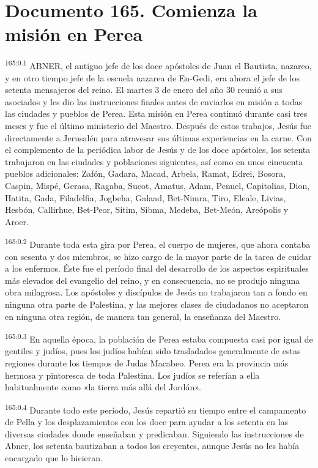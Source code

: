 \chapter{Documento 165. Comienza la misión en Perea}
\par 
\textsuperscript{165:0.1} ABNER, el antiguo jefe de los doce apóstoles de Juan el Bautista, nazareo, y en otro tiempo jefe de la escuela nazarea de En-Gedi, era ahora el jefe de los setenta mensajeros del reino. El martes 3 de enero del año 30 reunió a sus asociados y les dio las instrucciones finales antes de enviarlos en misión a todas las ciudades y pueblos de Perea. Esta misión en Perea continuó durante casi tres meses y fue el último ministerio del Maestro. Después de estos trabajos, Jesús fue directamente a Jerusalén para atravesar sus últimas experiencias en la carne. Con el complemento de la periódica labor de Jesús y de los doce apóstoles, los setenta trabajaron en las ciudades y poblaciones siguientes, así como en unos cincuenta pueblos adicionales: Zafón, Gadara, Macad, Arbela, Ramat, Edrei, Bosora, Caspin, Mispé, Gerasa, Ragaba, Sucot, Amatus, Adam, Penuel, Capitolias, Dion, Hatita, Gada, Filadelfia, Jogbeha, Galaad, Bet-Nimra, Tiro, Eleale, Livias, Hesbón, Callirhue, Bet-Peor, Sitim, Sibma, Medeba, Bet-Meón, Areópolis y Aroer.

\par 
\textsuperscript{165:0.2} Durante toda esta gira por Perea, el cuerpo de mujeres, que ahora contaba con sesenta y dos miembros, se hizo cargo de la mayor parte de la tarea de cuidar a los enfermos. Éste fue el período final del desarrollo de los aspectos espirituales más elevados del evangelio del reino, y en consecuencia, no se produjo ninguna obra milagrosa. Los apóstoles y discípulos de Jesús no trabajaron tan a fondo en ninguna otra parte de Palestina, y las mejores clases de ciudadanos no aceptaron en ninguna otra región, de manera tan general, la enseñanza del Maestro.

\par 
\textsuperscript{165:0.3} En aquella época, la población de Perea estaba compuesta casi por igual de gentiles y judíos, pues los judíos habían sido trasladados generalmente de estas regiones durante los tiempos de Judas Macabeo. Perea era la provincia más hermosa y pintoresca de toda Palestina. Los judíos se referían a ella habitualmente como «la tierra más allá del Jordán».

\par 
\textsuperscript{165:0.4} Durante todo este período, Jesús repartió su tiempo entre el campamento de Pella y los desplazamientos con los doce para ayudar a los setenta en las diversas ciudades donde enseñaban y predicaban. Siguiendo las instrucciones de Abner, los setenta bautizaban a todos los creyentes, aunque Jesús no les había encargado que lo hicieran.

